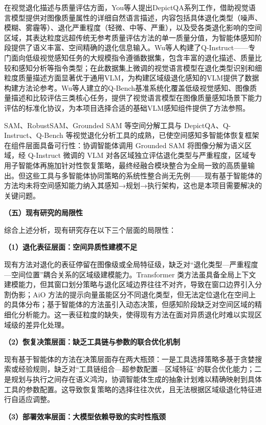 在视觉退化描述与质量评估方面，You等人\cite{depictqa}提出DepictQA系列工作，借助视觉语言模型提供对图像质量属性的详细自然语言描述，内容包括具体退化类型（噪声、模糊、雾霾等）、退化严重程度（轻微、中等、严重），以及受各类退化影响的空间区域，其表达粒度远超传统无参考质量评估方法的单一质量分值，为智能体感知阶段提供了语义丰富、空间精确的退化信息输入。Wu等人\cite{qinstruct}构建了Q-Instruct——专门面向低级视觉感知任务的大规模指令遵循数据集，包含丰富的退化描述、质量比较和感知分析等指令类型；在此数据集上微调的视觉语言模型在退化类型识别和细粒度质量描述方面显著优于通用VLM，为构建区域级退化感知的VLM提供了数据构建方法论参考。Wu等人\cite{qbench}建立的Q-Bench基准系统化覆盖低级视觉感知、图像质量描述和比较评估三类核心任务，提供了视觉语言模型在图像质量感知场景下能力评估的标准化协议，为本项目选择合适的基础VLM感知组件提供了方法参照。

SAM、RobustSAM、Grounded SAM 等空间分解工具与 DepictQA、Q-Instruct、Q-Bench 等视觉退化分析工具的成熟，已使空间感知多智能体恢复框架在组件层面具备可行性：协调智能体调用 Grounded SAM 将图像分解为语义区域，经 Q-Instruct 微调的 VLM 对各区域独立评估退化类型与严重程度，区域专用子智能体再施加针对性恢复策略，最终经融合模块整合为全局一致的高质量输出。但这些工具与多智能体协同策略的系统性整合尚无先例——现有基于智能体的方法均未将空间感知能力纳入其感知→规划→执行架构，这也是本项目需要解决的关键问题。

\textbf{（五）现有研究的局限性}

综合上述分析，现有研究存在以下三个层面的局限性：

\textbf{（1）退化表征层面：空间异质性建模不足}

现有方法对退化的表征停留在图像级或全局特征级，缺乏对“退化类型—严重程度—空间位置”耦合关系的区域级建模能力。Transformer 类方法虽具备全局上下文建模能力，但其窗口划分策略与退化区域边界往往不对齐，导致在窗口边界引入分割伪影；AiO 方法的提示向量虽能区分不同退化类型，但无法定位退化在空间上的具体分布；基于智能体的方法虽引入动态决策，但感知阶段缺乏对空间区域的精细化分析能力。这一表征粒度的缺失，使得现有方法在面对异质退化时难以实现区域级的差异化处理。

\textbf{（2）恢复决策层面：缺乏工具链与参数的联合优化机制}

现有基于智能体的方法在决策层面存在两大瓶颈：一是工具选择策略多基于贪婪搜索或经验规则，缺乏对“工具链组合—超参数配置—区域特征”的联合优化能力；二是规划与执行之间存在语义鸿沟，协调智能体生成的抽象计划难以精确映射到具体工具的参数配置。这导致恢复策略的选择往往次优，且无法根据区域级退化特征进行自适应调整。

\textbf{（3）部署效率层面：大模型依赖导致的实时性瓶颈}

